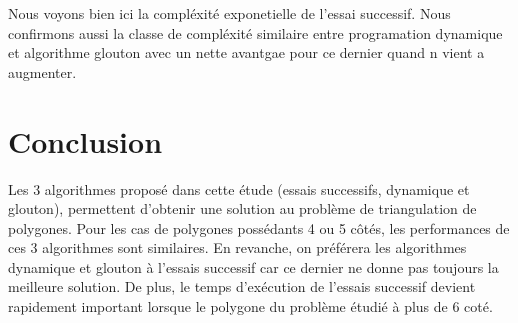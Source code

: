 \documentclass[a4paper,10pt]{article}
\begin{document}
Nous voyons bien ici la compléxité exponetielle de l'essai successif.
Nous confirmons aussi la classe de compléxité similaire entre programation dynamique et algorithme glouton avec un nette avantgae pour ce dernier quand n vient a augmenter.

\section{Conclusion}
Les 3 algorithmes proposé dans cette étude (essais successifs, dynamique et glouton), permettent d'obtenir une solution au problème de triangulation de polygones.
Pour les cas de polygones possédants 4 ou 5 côtés, les performances de ces 3 algorithmes sont similaires.
En revanche, on préférera les algorithmes dynamique et glouton à l'essais successif car ce dernier ne donne pas toujours la meilleure solution.
De plus, le temps d'exécution de l'essais successif devient rapidement important lorsque le polygone du problème étudié à plus de 6 coté.
\end{document}

